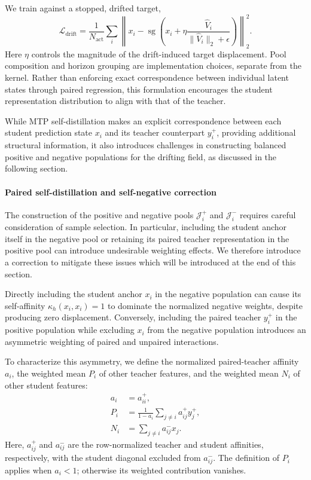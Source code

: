 \documentclass{article}
\begin{document}
We train against a stopped, drifted target,
\begin{equation}
 \mathcal L_{\mathrm{drift}}=\frac{1}{N_{\mathrm{act}}}\sum_i
 \left\|x_i-\operatorname{sg}\!\left(x_i+
 \eta\frac{\widehat V_i}{\|\widehat V_i\|_2+\epsilon}\right)\right\|_2^2.
\end{equation}
Here $\eta$ controls the magnitude of the drift-induced target displacement. Pool composition and horizon grouping are implementation choices, separate from the kernel. Rather than enforcing exact correspondence between individual latent states through paired regression, this formulation encourages the student representation distribution to align with that of the teacher.


While MTP self-distillation makes an
explicit correspondence between each student prediction
state $x_i$ and its teacher counterpart $y_i^+$, providing additional structural information, it also introduces challenges in constructing balanced positive and negative populations for the drifting field, as discussed in the following section.

\paragraph{Paired self-distillation and self-negative correction}
\label{sec:self-negative}

The construction of the positive and negative pools
$\mathcal J_i^+$ and $\mathcal J_i^-$ requires careful
consideration of sample selection. In particular, including
the student anchor itself in the negative pool or retaining
its paired teacher representation in the positive pool
can introduce undesirable weighting effects. We therefore
introduce a correction to mitigate these issues which will be introduced at the end of this section.


Directly including the student anchor $x_i$ in the
negative population can cause its self-affinity
$\kappa_h(x_i,x_i)=1$ to dominate the normalized negative
weights, despite producing zero displacement.
Conversely, including the paired teacher $y_i^+$ in
the positive population while excluding $x_i$ from
the negative population introduces an asymmetric
weighting of paired and unpaired interactions.

To characterize this asymmetry, we define the normalized
paired-teacher affinity $a_i$, the weighted mean $P_i$
of other teacher features, and the weighted mean $N_i$
of other student features:
\begin{equation}
\begin{aligned}
a_i &= a_{ii}^{+},\\
P_i &= \frac{1}{1-a_i}
       \sum_{j\neq i}a_{ij}^{+}y_j^{+},\\
N_i &= \sum_{j\neq i}a_{ij}^{-}x_j.
\end{aligned}
\label{eq:population_means}
\end{equation}
Here, $a_{ij}^{+}$ and $a_{ij}^{-}$ are the
row-normalized teacher and student affinities,
respectively, with the student diagonal excluded
from $a_{ij}^{-}$. The definition of $P_i$ applies
when $a_i<1$; otherwise its weighted contribution
vanishes.
\end{document}
